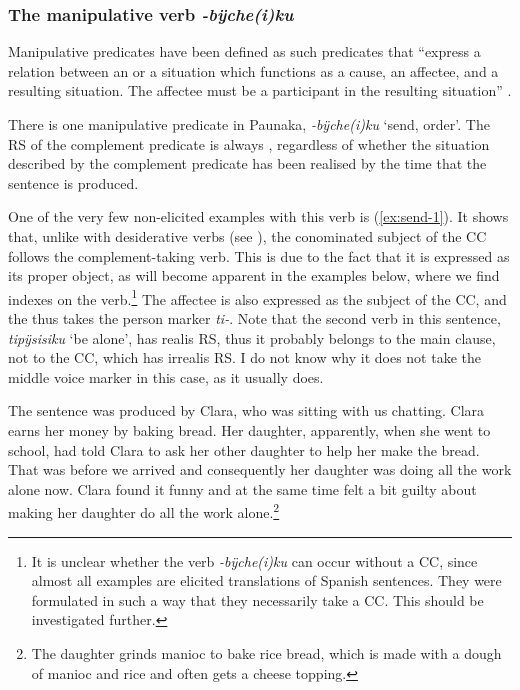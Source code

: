 \subsubsection{The manipulative verb \textit{-bÿche(i)ku}}\label{sec:CC_Manipulative}


Manipulative predicates have been defined as such predicates that “express a relation between an  or a situation which functions as a cause, an affectee, and a resulting situation. The affectee must be a participant in the resulting situation” \citep[136]{Noonan2007}.

There is one manipulative predicate in Paunaka, \textit{-bÿche(i)ku} ‘send, order’. %
The RS of the complement predicate is always , regardless of whether the situation described by the complement predicate has been realised by the time that the sentence is produced.

One of the very few non-elicited examples with this verb is (\ref{ex:send-1}). It shows that, unlike with desiderative verbs (see ), the conominated subject of the CC follows the complement-taking verb. This is due to the fact that it is expressed as its proper object, as will become apparent in the examples below, where we find indexes on the verb.\footnote{It is unclear whether the verb \textit{-bÿche(i)ku} can occur without a CC, since almost all examples are elicited translations of Spanish sentences. They were formulated in such a way that they necessarily take a CC. This should be investigated further.} The affectee is also expressed as the subject of the CC, and the  thus takes the person marker \textit{ti-}. Note that the second verb in this sentence, \textit{tipÿsisiku} ‘be alone’, has realis RS, thus it probably belongs to the main clause, not to the CC, which has irrealis RS. I do not know why it does not take the middle voice marker in this case, as it usually does.

The sentence was produced by Clara, who was sitting with us chatting. Clara earns her money by baking bread. Her daughter, apparently, when she went to school, had told Clara to ask her other daughter to help her make the bread. That was before we arrived and consequently her daughter was doing all the work alone now. Clara found it funny and at the same time felt a bit guilty about making her daughter do all the work alone.\footnote{The daughter grinds manioc to bake rice bread, which is made with a dough of manioc and rice and often gets a cheese topping.}

